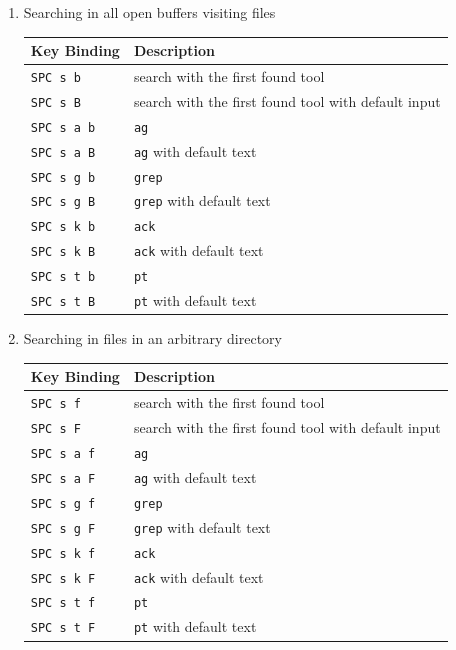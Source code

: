 \documentclass[11pt]{article}
\begin{document}
\begin{enumerate}
\item Searching in all open buffers visiting files
\label{sec:org99ec8b7}

\begin{center}
\begin{tabular}{ll}
Key Binding & Description\\
\hline
\texttt{SPC s b} & search with the first found tool\\
\texttt{SPC s B} & search with the first found tool with default input\\
\texttt{SPC s a b} & \texttt{ag}\\
\texttt{SPC s a B} & \texttt{ag} with default text\\
\texttt{SPC s g b} & \texttt{grep}\\
\texttt{SPC s g B} & \texttt{grep} with default text\\
\texttt{SPC s k b} & \texttt{ack}\\
\texttt{SPC s k B} & \texttt{ack} with default text\\
\texttt{SPC s t b} & \texttt{pt}\\
\texttt{SPC s t B} & \texttt{pt} with default text\\
\end{tabular}
\end{center}

\item Searching in files in an arbitrary directory
\label{sec:orgbeb67bd}

\begin{center}
\begin{tabular}{ll}
Key Binding & Description\\
\hline
\texttt{SPC s f} & search with the first found tool\\
\texttt{SPC s F} & search with the first found tool with default input\\
\texttt{SPC s a f} & \texttt{ag}\\
\texttt{SPC s a F} & \texttt{ag} with default text\\
\texttt{SPC s g f} & \texttt{grep}\\
\texttt{SPC s g F} & \texttt{grep} with default text\\
\texttt{SPC s k f} & \texttt{ack}\\
\texttt{SPC s k F} & \texttt{ack} with default text\\
\texttt{SPC s t f} & \texttt{pt}\\
\texttt{SPC s t F} & \texttt{pt} with default text\\
\end{tabular}
\end{center}


\end{enumerate}
\end{document}
